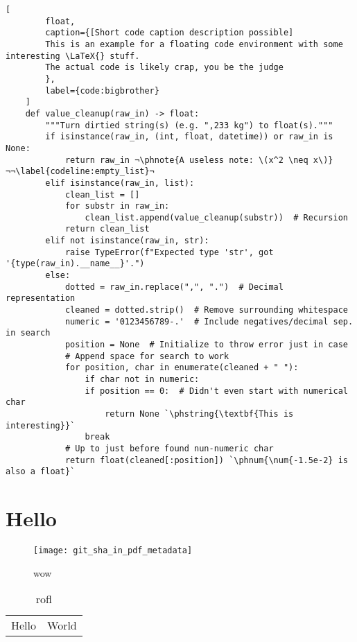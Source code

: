 \lstlistoflistings%

\begin{lstlisting}[
        float,
        caption={[Short code caption description possible]
        This is an example for a floating code environment with some interesting \LaTeX{} stuff.
        The actual code is likely crap, you be the judge
        },
        label={code:bigbrother}
    ]
    def value_cleanup(raw_in) -> float:
        """Turn dirtied string(s) (e.g. ",233 kg") to float(s)."""
        if isinstance(raw_in, (int, float, datetime)) or raw_in is None:
            return raw_in ¬\phnote{A useless note: \(x^2 \neq x\)}¬¬\label{codeline:empty_list}¬
        elif isinstance(raw_in, list):
            clean_list = []
            for substr in raw_in:
                clean_list.append(value_cleanup(substr))  # Recursion
            return clean_list
        elif not isinstance(raw_in, str):
            raise TypeError(f"Expected type 'str', got '{type(raw_in).__name__}'.")
        else:
            dotted = raw_in.replace(",", ".")  # Decimal representation
            cleaned = dotted.strip()  # Remove surrounding whitespace
            numeric = '0123456789-.'  # Include negatives/decimal sep. in search
            position = None  # Initialize to throw error just in case
            # Append space for search to work
            for position, char in enumerate(cleaned + " "):
                if char not in numeric:
                if position == 0:  # Didn't even start with numerical char
                    return None `\phstring{\textbf{This is interesting}}`
                break
            # Up to just before found nun-numeric char
            return float(cleaned[:position]) `\phnum{\num{-1.5e-2} is also a float}`
\end{lstlisting}

\chapter{Hello}

\begin{figure}
    \texttt{[image: git\_sha\_in\_pdf\_metadata]}
    \caption{wow}
\end{figure}

\begin{table}
    \begin{tabular}{ll}
        Hello & World\\
    \end{tabular}
    \caption{rofl}
\end{table}
